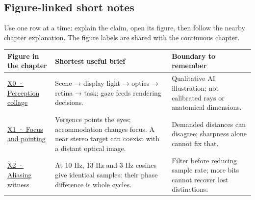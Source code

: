 \subsection{Figure-linked short notes}\label{figure-linked-short-notes}

Use one row at a time: explain the claim, open its figure, then follow the nearby chapter explanation. The figure labels are shared with the continuous chapter.

{\def\LTcaptype{none} %
\begin{longtable}[]{@{}
  >{\raggedright\arraybackslash}p{}
  >{\raggedright\arraybackslash}p{}
  >{\raggedright\arraybackslash}p{}@{}}
\toprule\noalign{}
\begin{minipage}[b]{\linewidth}\raggedright
Figure in the chapter
\end{minipage} & \begin{minipage}[b]{\linewidth}\raggedright
Shortest useful brief
\end{minipage} & \begin{minipage}[b]{\linewidth}\raggedright
Boundary to remember
\end{minipage} \\
\midrule\noalign{}
\endhead
\bottomrule\noalign{}
\endlastfoot
\href{Continuous\%20Notes/University\%20-\%20Worlds,\%20Images\%20and\%20Inference\%20-\%20Graphics,\%20Vision\%20and\%20Photography\#Figure\%20X0\%20—\%20A\%20qualitative\%20picture\%20of\%20the\%20XR\%20loop/}{X0 · Perception collage} & Scene → display light → optics → retina → task; gaze feeds rendering decisions. & Qualitative AI illustration; not calibrated rays or anatomical dimensions. \\
\href{Continuous\%20Notes/University\%20-\%20Worlds,\%20Images\%20and\%20Inference\%20-\%20Graphics,\%20Vision\%20and\%20Photography\#Figure\%20X1\%20—\%20Two\%20simultaneous\%20depth\%20demands/}{X1 · Focus and pointing} & Vergence points the eyes; accommodation changes focus. A near stereo target can coexist with a distant optical image. & Demanded distances can disagree; sharpness alone cannot fix that. \\
\href{Continuous\%20Notes/University\%20-\%20Worlds,\%20Images\%20and\%20Inference\%20-\%20Graphics,\%20Vision\%20and\%20Photography\#Figure\%20X2\%20—\%20The\%20samples\%20cannot\%20name\%20their\%20original/}{X2 · Aliasing witness} & At 10 Hz, 13 Hz and 3 Hz cosines give identical samples: their phase difference is whole cycles. & Filter before reducing sample rate; more bits cannot recover lost distinctions. \\

\end{longtable}}

